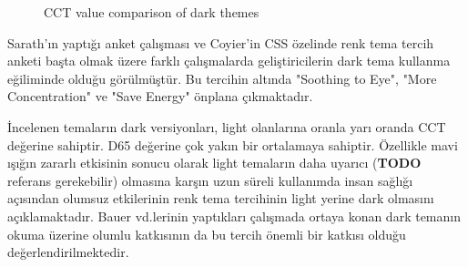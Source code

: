 \documentclass{article}
\begin{document}
\begin{figure}[h]
  \caption{CCT value comparison of dark themes}
  \label{fig:dark-compare}
\end{figure}

Sarath'ın yaptığı anket çalışması \cite{sarath2016prefer} ve Coyier'in CSS özelinde renk tema tercih anketi \cite{coyier2013poll} başta olmak üzere farklı çalışmalarda geliştiricilerin dark tema kullanma eğiliminde olduğu görülmüştür. Bu tercihin altında "Soothing to Eye", "More Concentration" ve "Save Energy" önplana çıkmaktadır.

İncelenen temaların dark versiyonları, light olanlarına oranla yarı oranda CCT değerine sahiptir. D65 değerine çok yakın bir ortalamaya sahiptir. Özellikle mavi ışığın zararlı etkisinin sonucu olarak light temaların daha uyarıcı (\textbf{TODO} referans gerekebilir) olmasına karşın uzun süreli kullanımda insan sağlığı açısından olumsuz etkilerinin renk tema tercihinin light yerine dark olmasını açıklamaktadır. Bauer vd.lerinin \cite{bauer1980improving} yaptıkları çalışmada ortaya konan dark temanın okuma üzerine olumlu katkısının da bu tercih önemli bir katkısı olduğu değerlendirilmektedir.
\end{document}
